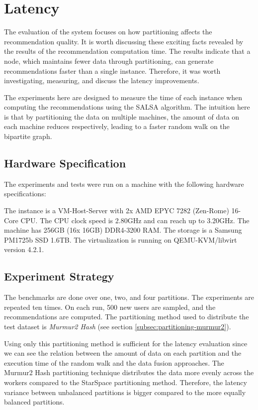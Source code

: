 \section{Latency}
\label{sec:eval-latency}
The evaluation of the system focuses on how partitioning affects the recommendation quality. It is worth discussing these exciting facts revealed by the results of the recommendation computation time. The results indicate that a node, which maintains fewer data through partitioning, can generate recommendations faster than a single instance. Therefore, it was worth investigating, measuring, and discuss the latency improvements.


The experiments here are designed to measure the time of each instance when computing the recommendations using the SALSA algorithm. The intuition here is that by partitioning the data on multiple machines, the amount of data on each machine reduces respectively, leading to a faster random walk on the bipartite graph. 

\subsection{Hardware Specification}
\label{subsec:hardware-spec}
The experiments and tests were run on a machine with the following hardware specifications:

The instance is a VM-Host-Server with 2x AMD EPYC 7282 (Zen-Rome) 16-Core CPU. The CPU clock speed is 2.80GHz and can reach up to 3.20GHz. The machine has 256GB (16x 16GB) DDR4-3200 RAM. The storage is a Samsung PM1725b SSD 1.6TB. The virtualization is running on QEMU-KVM/libvirt version 4.2.1.


\subsection{Experiment Strategy}
\label{subsec:latency-experiment-strategy}
The benchmarks are done over one, two, and four partitions. The experiments are repeated ten times. On each run, 500 new users are sampled, and the recommendations are computed. The partitioning method used to distribute the test dataset is \emph{Murmur2 Hash} (see section \ref{subsec:partitioning-murmur2}). 


Using only this partitioning method is sufficient for the latency evaluation since we can see the relation between the amount of data on each partition and the execution time of the random walk and the data fusion approaches. The Murmur2 Hash partitioning technique distributes the data more evenly across the workers compared to the StarSpace partitioning method. Therefore, the latency variance between unbalanced partitions is bigger compared to the more equally balanced partitions.


